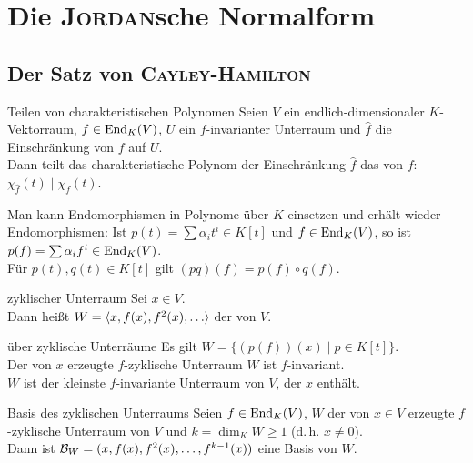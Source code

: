 \section{%
    Die \textsc{Jordan}sche Normalform%
}

\subsection{%
    Der Satz von \textsc{Cayley}-\textsc{Hamilton}%
}

\begin{Satz}{Teilen von charakteristischen Polynomen}
    Seien $V$ ein endlich-dimensionaler $K$-Vektorraum, $f \in \operatorname{End}_K(V)$,
    $U$ ein $f$-invarianter Unterraum und $\widehat{f}$ die Einschränkung
    von $f$ auf $U$. \\
    Dann teilt das charakteristische Polynom der Einschränkung $\widehat{f}$
    das von $f$:
    $\chi_{\widehat{f}}(t) \;|\; \chi_f(t)$.
\end{Satz}

\begin{Bem}
    Man kann Endomorphismen in Polynome über $K$ einsetzen und erhält
    wieder Endomorphismen:
    Ist $p(t) = \sum \alpha_i t^i \in K[t]$ und $f \in \operatorname{End}_K(V)$,
    so ist $p(f) = \sum \alpha_i f^i \in \operatorname{End}_K(V)$. \\
    Für $p(t), q(t) \in K[t]$ gilt $(pq)(f) = p(f) \circ q(f)$.
\end{Bem}

\begin{Def}{zyklischer Unterraum}
    Sei $x \in V$. \\
    Dann heißt $W = \aufspann{x, f(x), f^2(x), \dotsc}$
    der  von $V$.
\end{Def}

\begin{Lemma}{über zyklische Unterräume}
    Es gilt $W = \{(p(f))(x) \;|\; p \in K[t]\}$. \\
    Der von $x$ erzeugte $f$-zyklische Unterraum $W$ ist $f$-invariant. \\
    $W$ ist der kleinste $f$-invariante Unterraum von $V$, der $x$ enthält.
\end{Lemma}

\begin{Satz}{Basis des zyklischen Unterraums}
    Seien $f \in \operatorname{End}_K(V)$, $W$ der von $x \in V$ erzeugte $f$-zyklische
    Unterraum von $V$ und $k = \dim_K W \ge 1$ (d.\,h. $x \not= 0$). \\
    Dann ist $\mathcal{B}_W = (x, f(x), f^2(x), \dotsc, f^{k-1}(x))$ eine
    Basis von $W$.
\end{Satz}


